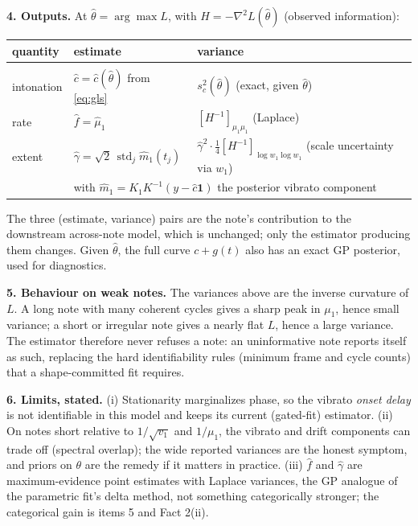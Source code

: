 \documentclass[10pt,a4paper]{article}
\newcommand{\one}{\mathbf{1}}
\begin{document}
\textbf{4. Outputs.}
At $\hat\theta = \arg\max L$, with $H = -\nabla^2 L(\hat\theta)$ (observed
information):
\begin{center}
\begin{tabular}{lll}
quantity & estimate & variance \\[1pt]
\hline \\[-9pt]
intonation & $\hat c = \hat c(\hat\theta)$ from \eqref{eq:gls} &
$s_c^2(\hat\theta)$ \quad (exact, given $\hat\theta$) \\[2pt]
rate & $\hat f = \hat\mu_1$ &
$[H^{-1}]_{\mu_1 \mu_1}$ \quad (Laplace) \\[2pt]
extent & $\hat\gamma = \sqrt{2}\,\operatorname{std}_j \hat m_1(t_j)$ &
$\hat\gamma^2 \cdot \tfrac14 [H^{-1}]_{\log w_1 \log w_1}$
\quad (scale uncertainty via $w_1$) \\
& \multicolumn{2}{l}{\quad with $\hat m_1 = K_1 K^{-1} (y - \hat c \one)$
the posterior vibrato component} \\
\end{tabular}
\end{center}
The three (estimate, variance) pairs are the note's contribution to the
downstream across-note model, which is unchanged; only the estimator
producing them changes. Given $\hat\theta$, the full curve $c + g(t)$ also
has an exact GP posterior, used for diagnostics.

\textbf{5. Behaviour on weak notes.}
The variances above are the inverse curvature of $L$. A long note with
many coherent cycles gives a sharp peak in $\mu_1$, hence small variance;
a short or irregular note gives a nearly flat $L$, hence a large variance.
The estimator therefore never refuses a note: an uninformative note
reports itself as such, replacing the hard identifiability rules
(minimum frame and cycle counts) that a shape-committed fit requires.

\textbf{6. Limits, stated.}
(i) Stationarity marginalizes phase, so the vibrato \emph{onset delay} is
not identifiable in this model and keeps its current (gated-fit)
estimator. (ii) On notes short relative to $1/\sqrt{v_1}$ and
$1/\mu_1$, the vibrato and drift components can trade off (spectral
overlap); the wide reported variances are the honest symptom, and priors
on $\theta$ are the remedy if it matters in practice. (iii) $\hat f$ and
$\hat\gamma$ are maximum-evidence point estimates with Laplace variances,
the GP analogue of the parametric fit's delta method, not something
categorically stronger; the categorical gain is items 5 and Fact 2(ii).
\end{document}
